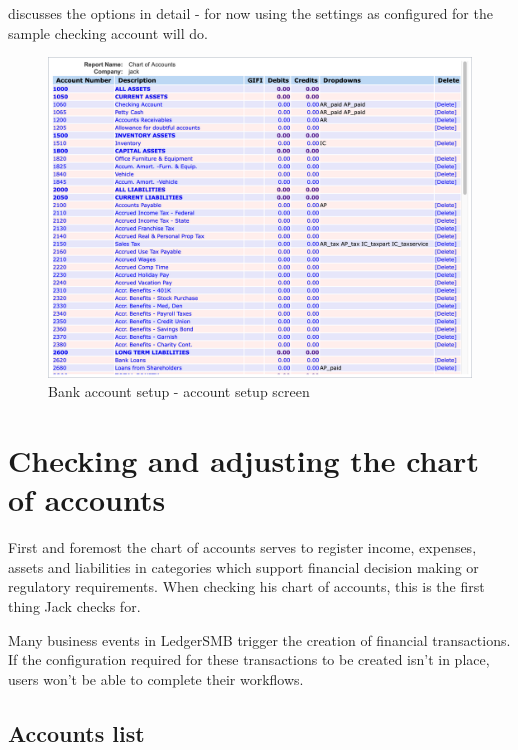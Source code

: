  discusses the options in detail - for now using the
settings as configured for the sample checking account will do.

\begin{figure}[h]
        \centering
\includegraphics[width=\linewidth]{auto-screenshots/general-journal--chart-of-accounts.png}
\caption{Bank account setup - account setup screen}
\label{fig:bank-setup2}
\end{figure}


\section{Checking and adjusting the chart of accounts}
\label{sec-first-login-coa-check}

First and foremost the chart of accounts serves to register income, expenses,
assets and liabilities in categories which support financial decision making or
regulatory requirements. When checking his chart of accounts, this is the first
thing Jack checks for.

Many business events in LedgerSMB trigger the creation of financial transactions.
If the configuration required for these transactions to be created isn't in place,
users won't be able to complete their workflows. 

\subsection{Accounts list}
\label{subsec-first-login-accounts-list}

